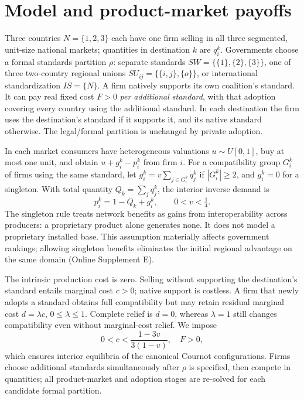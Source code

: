 \section{Model and product-market payoffs}\label{sec:short-model}
Three countries $N=\{1,2,3\}$ each have one firm selling in all three segmented, unit-size national markets; quantities in destination $k$ are $q_i^k$. Governments choose a formal standards partition $\rho$: separate standards $SW=\{\{1\},\{2\},\{3\}\}$, one of three two-country regional unions $SU_{ij}=\{\{i,j\},\{o\}\}$, or international standardization $IS=\{N\}$. A firm natively supports its own coalition's standard. It can pay real fixed cost $F>0$ \emph{per additional standard}, with that adoption covering every country using the additional standard. In each destination the firm uses the destination's standard if it supports it, and its native standard otherwise. The legal/formal partition is unchanged by private adoption.

In each market consumers have heterogeneous valuations $u\sim U[0,1]$, buy at most one unit, and obtain $u+g_i^k-p_i^k$ from firm $i$. For a compatibility group $G_i^k$ of firms using the same standard, let $g_i^k=v\sum_{j\in G_i^k}q_j^k$ if $|G_i^k|\ge2$, and $g_i^k=0$ for a singleton. With total quantity $Q_k=\sum_jq_j^k$, the interior inverse demand is
\begin{equation}\label{eq:short-demand}
p_i^k=1-Q_k+g_i^k,\qquad 0<v<\tfrac14.
\end{equation}
The singleton rule treats network benefits as gains from interoperability across producers: a proprietary product alone generates none. It does not model a proprietary installed base. This assumption materially affects government rankings; allowing singleton benefits eliminates the initial regional advantage on the same domain (Online Supplement E).

The intrinsic production cost is zero. Selling without supporting the destination's standard entails marginal cost $c>0$; native support is costless. A firm that newly adopts a standard obtains full compatibility but may retain residual marginal cost $d=\lambda c$, $0\le\lambda\le1$. Complete relief is $d=0$, whereas $\lambda=1$ still changes compatibility even without marginal-cost relief. We impose
\begin{equation}\label{eq:short-domain}
0<c<\frac{1-3v}{3(1-v)},\quad F>0,
\end{equation}
which ensures interior equilibria of the canonical Cournot configurations. Firms choose additional standards simultaneously after $\rho$ is specified, then compete in quantities; all product-market and adoption stages are re-solved for each candidate formal partition.

